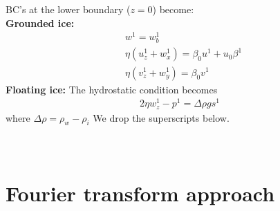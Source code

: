 \documentclass[paper=a4, fontsize=11pt]{article}
\begin{document}
BC's at the lower boundary ($z=0$) become:\\
\textbf{Grounded ice:}
\begin{align}
&w^1  = w_b^1\\
&\eta(u_z^1 + w_x^1) = \beta_0 u^1 + u_0\beta^1 \\
&\eta(v_z^1 +w_y^1) = \beta_0 v^1
\end{align}
\textbf{Floating ice:}
The hydrostatic condition becomes
\begin{align}
2\eta w_z^1 - p^1 = \Delta\rho g s^1
\end{align}
where $\Delta\rho = \rho_w-\rho_i$
We drop the superscripts below. \\ \\
\\ \section*{Fourier transform approach}
\end{document}

